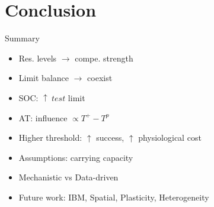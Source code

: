 \section{Conclusion}

\begin{frame}{Summary}
  \begin{itemize}
    \item Res. levels $\rightarrow$ compe. strength
    \item Limit balance $\rightarrow$ coexist
    \item SOC: $\uparrow\ test$ limit
    \item AT: influence $\propto T^+ - T^p$
    \item Higher threshold: $\uparrow$ success, $\uparrow$ physiological cost
    \item Assumptions: carrying capacity
    \item Mechanistic vs Data-driven
    \item Future work: IBM, Spatial, Plasticity, Heterogeneity
  \end{itemize}
\end{frame}
